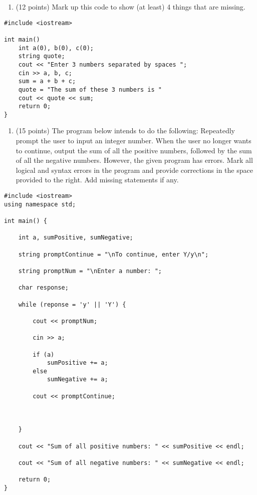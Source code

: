 \begin{verbatim}

\end{verbatim}

\pagebreak

\begin{enumerate}
\def\labelenumi{\arabic{enumi}.}
\setcounter{enumi}{2}
\tightlist
\item
  (12 points) Mark up this code to show (at least) 4 things that are
  missing.
\end{enumerate}

\begin{verbatim}
#include <iostream>

int main()
    int a(0), b(0), c(0);
    string quote;
    cout << "Enter 3 numbers separated by spaces ";
    cin >> a, b, c;
    sum = a + b + c;
    quote = "The sum of these 3 numbers is "
    cout << quote << sum;
    return 0;
}
\end{verbatim}

\pagebreak

\begin{enumerate}
\def\labelenumi{\arabic{enumi}.}
\setcounter{enumi}{3}
\tightlist
\item
  (15 points) The program below intends to do the following: Repeatedly
  prompt the user to input an integer number. When the user no longer
  wants to continue, output the sum of all the positive numbers,
  followed by the sum of all the negative numbers. However, the given
  program has errors. Mark all logical and syntax errors in the program
  and provide corrections in the space provided to the right. Add
  missing statements if any.
\end{enumerate}

\begin{verbatim}
#include <iostream>
using namespace std;

int main() {

    int a, sumPositive, sumNegative;

    string promptContinue = "\nTo continue, enter Y/y\n";

    string promptNum = "\nEnter a number: ";

    char response;

    while (reponse = 'y' || 'Y') {

        cout << promptNum;

        cin >> a;

        if (a)
            sumPositive += a;
        else
            sumNegative += a;

        cout << promptContinue;



    }

    cout << "Sum of all positive numbers: " << sumPositive << endl;

    cout << "Sum of all negative numbers: " << sumNegative << endl;

    return 0;
}
\end{verbatim}

